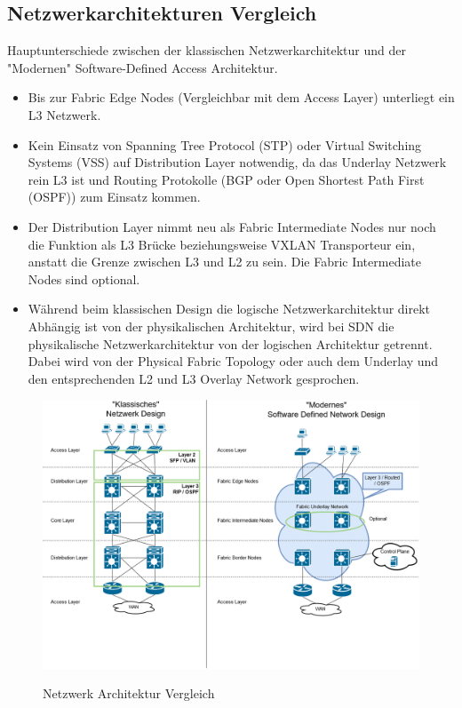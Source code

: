 \subsection{Netzwerkarchitekturen Vergleich}
Hauptunterschiede zwischen der klassischen Netzwerkarchitektur und der "Modernen" Software-Defined Access Architektur. 

\begin{itemize}
	\item Bis zur Fabric Edge Nodes (Vergleichbar mit dem Access Layer) unterliegt ein L3 Netzwerk. 
	\item Kein Einsatz von Spanning Tree Protocol (STP) oder Virtual Switching Systems (VSS) auf Distribution Layer notwendig, da das Underlay Netzwerk rein L3 ist und Routing Protokolle (BGP oder Open Shortest Path First (OSPF)) zum Einsatz kommen.
	\item Der Distribution Layer nimmt neu als Fabric Intermediate Nodes nur noch die Funktion als L3 Brücke beziehungsweise VXLAN Transporteur ein, anstatt die Grenze zwischen L3 und L2 zu sein. Die Fabric Intermediate Nodes sind optional. 
	\item Während beim klassischen Design die logische Netzwerkarchitektur direkt Abhängig ist von der physikalischen Architektur, wird bei SDN die physikalische Netzwerkarchitektur von der logischen Architektur getrennt. Dabei wird von der Physical Fabric Topology oder auch dem Underlay und den entsprechenden L2 und L3 Overlay Network gesprochen. 
\end{itemize}

\begin{figure}[H]
	\centering
	\includegraphics[width=1\linewidth]{img/LabNetworkArchitecture_Vergleich.png}\\[1px]
	\caption{Netzwerk Architektur Vergleich}
	\label{fig:LabNetworkArchitectureVergleich}
\end{figure}


